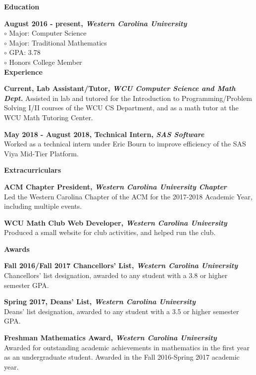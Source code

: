 \documentclass[a4paper,12pt,final]{memoir}
\newcommand{\Sep}{\vspace{1.5em}}
\newcommand{\SmallSep}{\vspace{0.5em}}
\newcommand{\CVSection}[1]
	{\Large\textbf{#1}\par
	\SmallSep\normalsize\normalfont}
\newcommand{\CVItem}[1]
	{\textbf{\color{RoyalBlue} #1}}
\begin{document}
\CVSection{Education}
\CVItem{August 2016 - present, \textit{Western Carolina University}}\\
{\color{RoyalBlue}$\circ$} Major: Computer Science \\
{\color{RoyalBlue}$\circ$} Major: Traditional Mathematics \\
{\color{RoyalBlue}$\circ$} GPA: 3.78 \\
{\color{RoyalBlue}$\circ$} Honors College Member \\

\CVSection{Experience}
\CVItem{Current, Lab Assistant/Tutor, \textit{WCU Computer Science and Math Dept.}}
Assisted in lab and tutored for the Introduction to Programming/Problem Solving I/II courses of the WCU CS Department, and as a math tutor at the WCU Math Tutoring Center.
\SmallSep

\CVItem{May 2018 - August 2018, Technical Intern, \textit{SAS Software}}\\
Worked as a technical intern under Eric Bourn to improve efficiency of the SAS Viya Mid-Tier Platform.
\Sep


\CVSection{Extracurriculars}
\CVItem{ACM Chapter President, \textit{Western Carolina University Chapter}}\\
Led the Western Carolina Chapter of the ACM for the 2017-2018 Academic Year, including multiple events.
\SmallSep

\CVItem{WCU Math Club Web Developer, \textit{Western Carolina University}}\\
Produced a small website for club activities, and helped run the club.

\Sep

\CVSection{Awards}
\CVItem{Fall 2016/Fall 2017 Chancellors' List, \textit{Western Carolina University}}\\
Chancellors' list designation, awarded to any student with a 3.8 or higher semester GPA.

\SmallSep

\CVItem{Spring 2017, Deans' List, \textit{Western Carolina University}}\\
Deans' list designation, awarded to any student with a 3.5 or higher semester GPA.

\SmallSep

\CVItem{Freshman Mathematics Award, \textit{Western Carolina University}}\\
Awarded for outstanding academic achievements in mathematics in the first year as an undergraduate student. Awarded in the Fall 2016-Spring 2017 academic year.
\end{document}
